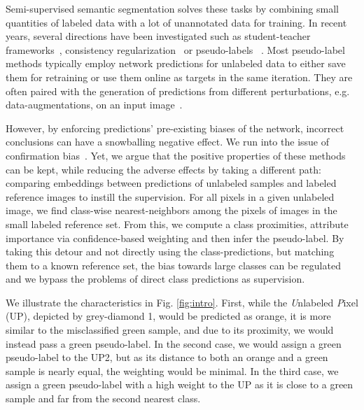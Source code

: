 \documentclass[letterpaper]{article} %
\begin{document}
Semi-supervised semantic segmentation solves these tasks by combining small quantities of labeled data with a lot of unannotated data for training.
In recent years, several directions have been investigated such as student-teacher frameworks~\cite{gou2021knowledge,chen2020big,Xie_2020_CVPR,pham2021meta}, consistency regularization~\cite{ouali2020semi,sohn2020fixmatch,rebuffi2020semi} or pseudo-labels ~\cite{lee2013pseudo,iscen2019label,rizve2021defense}. 
Most pseudo-label methods typically employ network predictions for unlabeled data to either save them for retraining or use them online as targets in the same iteration. They are often paired with the generation of predictions from different perturbations, e.g. data-augmentations, on an input image~\cite{berthelot2019mixmatch,berthelot2019remixmatch,sohn2020fixmatch}.

However, by enforcing predictions' pre-existing biases of the network, incorrect conclusions can have a snowballing negative effect. We run into the issue of confirmation bias~\cite{rizve2021defense}.
Yet, we argue that the positive properties of these methods can be kept, while reducing the adverse effects by taking a different path: comparing embeddings between predictions of unlabeled samples and labeled reference images to instill the supervision.
For all pixels in a given unlabeled image, we find class-wise nearest-neighbors among the pixels of images in the small labeled reference set.
From this, we compute a class proximities, attribute importance via confidence-based weighting and then infer the pseudo-label.
By taking this detour and not directly using the class-predictions, but matching them to a known reference set, the bias towards large classes can be regulated and  we bypass the problems of direct class predictions as supervision.

We illustrate the characteristics in Fig. \ref{fig:intro}. 
First, while the \textit{U}nlabeled \textit{P}ixel (UP), depicted by grey-diamond 1, would be predicted as orange, it is more similar to the misclassified green sample, and due to its proximity, we would instead pass a green pseudo-label.
In the second case, we would assign a green pseudo-label to the UP2, but as its distance to both an orange and a green sample is nearly equal, the weighting would be minimal.
In the third case, we assign a green pseudo-label with a high weight to the UP as it is close to a green sample and far from the second nearest class.
\end{document}
